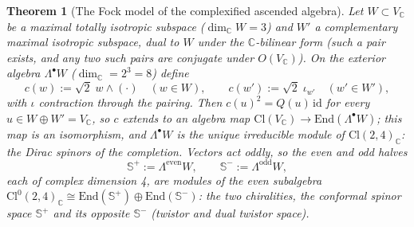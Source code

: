 \documentclass[11pt]{article}
\newtheorem{theorem}{Theorem}[section]
\theoremstyle{definition}
\theoremstyle{plain}
\newcommand{\changedmark}[2]{\marginpar{\raggedright\scriptsize\color{#1}#2}}
\providecommand{\C}{}\renewcommand{\C}{\mathbb{C}}
\providecommand{\CS}{}\renewcommand{\CS}{{\mathbb{S}^{+}}}
\providecommand{\CSm}{}\renewcommand{\CSm}{{\mathbb{S}^{-}}}
\providecommand{\Cl}{}\renewcommand{\Cl}{\mathrm{Cl}}
\providecommand{\End}{}\renewcommand{\End}{\mathrm{End}}
\providecommand{\id}{}\renewcommand{\id}{\mathrm{id}}
\begin{document}
\begin{theorem}[The Fock model of the complexified ascended algebra]\label{c:correspondence.fock-model-complexified-ascended-algebra}
\changedmark{gray}{reworded}
Let $W \subset V_\C$ be a maximal totally isotropic subspace ($\dim_\C W = 3$) and $W'$ a complementary maximal isotropic subspace, dual to $W$ under the $\C$-bilinear form (such a pair exists, and any two such pairs are conjugate under $O(V_\C)$). On the exterior algebra $\Lambda^\bullet W$ ($\dim_\C = 2^3 = 8$) define
\[
c(w) := \sqrt2\; w \wedge (\cdot) \quad (w \in W),
\qquad
c(w') := \sqrt2\; \iota_{w'} \quad (w' \in W'),
\]
with $\iota$ contraction through the pairing. Then $c(u)^2 = Q(u)\,\id$ for every $u \in W \oplus W' = V_\C$, so $c$ extends to an algebra map $\Cl(V_\C) \to \End(\Lambda^\bullet W)$; this map is an isomorphism, and $\Lambda^\bullet W$ is the unique irreducible module of $\Cl(2,4)_\C$: the Dirac spinors of the completion. Vectors act oddly, so the even and odd halves
\[
\CS := \Lambda^{\mathrm{even}} W, \qquad \CSm := \Lambda^{\mathrm{odd}} W,
\]
each of complex dimension 4, are modules of the even subalgebra $\Cl^0(2,4)_\C \cong \End(\CS) \oplus \End(\CSm)$: the two chiralities, the conformal spinor space $\CS$ and its opposite $\CSm$ (twistor and dual twistor space).
\end{theorem}
\end{document}
